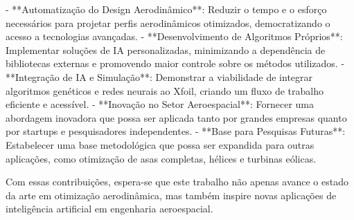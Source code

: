 - **Automatização do Design Aerodinâmico**: Reduzir o tempo e o esforço necessários para projetar perfis aerodinâmicos otimizados, democratizando o acesso a tecnologias avançadas.
- **Desenvolvimento de Algoritmos Próprios**: Implementar soluções de IA personalizadas, minimizando a dependência de bibliotecas externas e promovendo maior controle sobre os métodos utilizados.
- **Integração de IA e Simulação**: Demonstrar a viabilidade de integrar algoritmos genéticos e redes neurais ao Xfoil, criando um fluxo de trabalho eficiente e acessível.
- **Inovação no Setor Aeroespacial**: Fornecer uma abordagem inovadora que possa ser aplicada tanto por grandes empresas quanto por startups e pesquisadores independentes.
- **Base para Pesquisas Futuras**: Estabelecer uma base metodológica que possa ser expandida para outras aplicações, como otimização de asas completas, hélices e turbinas eólicas.

Com essas contribuições, espera-se que este trabalho não apenas avance o estado da arte em otimização aerodinâmica, mas também inspire novas aplicações de inteligência artificial em engenharia aeroespacial.